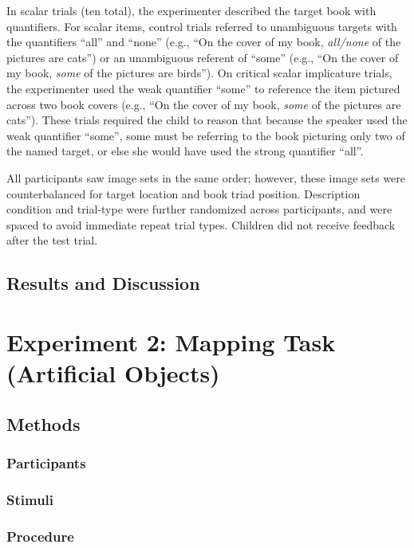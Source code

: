 \documentclass[man]{apa2}
\begin{document}
In scalar trials (ten total), the experimenter described the target book with quantifiers. For scalar items, control trials referred to unambiguous targets with the quantifiers ``all'' and ``none'' (e.g., ``On the cover of my book, \textit{all/none} of the pictures are cats'') or an unambiguous referent of ``some'' (e.g., ``On the cover of my book, \textit{some} of the pictures are birds''). On critical scalar implicature trials, the experimenter used the weak quantifier ``some'' to reference the item pictured across two book covers (e.g., ``On the cover of my book, \textit{some} of the pictures are cats''). These trials required the child to reason that because the speaker used the weak quantifier ``some'', some must be referring to the book picturing only two of the named target, or else she would have used the strong quantifier ``all''. 

All participants saw image sets in the same order; however, these image sets were counterbalanced for target location and book triad position. Description condition and trial-type were further randomized across participants, and were spaced to avoid immediate repeat trial types. Children did not receive feedback after the test trial.

\subsection{Results and Discussion}



\section{Experiment 2: Mapping Task (Artificial Objects)}


\subsection{Methods}
\subsubsection{Participants} 
\subsubsection{Stimuli}

\subsubsection{Procedure}
\end{document}

